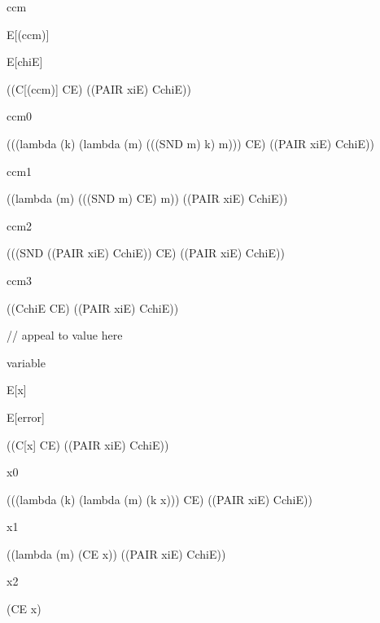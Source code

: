 \documentclass[ms,electronic,twosidetoc,letterpaper,chaptercenter,parttop]{byumsphd}
\begin{document}
\begin{singlespace}
ccm
\begin{schemedisplay}
E[(ccm)]
\end{schemedisplay}

\begin{schemedisplay}
E[chiE]
\end{schemedisplay}

\begin{schemedisplay}
((C[(ccm)] CE) ((PAIR xiE) CchiE))
\end{schemedisplay}

ccm0
\begin{schemedisplay}
(((lambda (k)
    (lambda (m)
      (((SND m) k) m)))
  CE)
 ((PAIR xiE) CchiE))
\end{schemedisplay}

ccm1
\begin{schemedisplay}
((lambda (m)
      (((SND m) CE) m))
 ((PAIR xiE) CchiE))
\end{schemedisplay}

ccm2
\begin{schemedisplay}
(((SND ((PAIR xiE) CchiE)) CE) ((PAIR xiE) CchiE))
\end{schemedisplay}

ccm3
\begin{schemedisplay}
((CchiE CE) ((PAIR xiE) CchiE))
\end{schemedisplay}

// appeal to value here

variable
\begin{schemedisplay}
E[x]
\end{schemedisplay}

\begin{schemedisplay}
E[error]
\end{schemedisplay}

\begin{schemedisplay}
((C[x] CE) ((PAIR xiE) CchiE))
\end{schemedisplay}

x0
\begin{schemedisplay}
(((lambda (k) (lambda (m) (k x))) CE) ((PAIR xiE) CchiE))
\end{schemedisplay}

x1
\begin{schemedisplay}
((lambda (m) (CE x)) ((PAIR xiE) CchiE))
\end{schemedisplay}

x2
\begin{schemedisplay}
(CE x)
\end{schemedisplay}


\end{singlespace}
\end{document}
